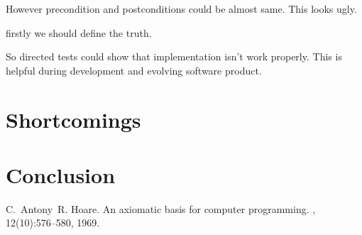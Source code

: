 \documentclass[twoside,twocolumn]{article}
\begin{document}



However precondition and postconditions could be almost same. This looks ugly.

firstly we should define the
truth. 

So directed tests could show that implementation isn't work properly. This is
helpful during development and evolving software product.





\section{Shortcomings}

\section{Conclusion}

\begin{thebibliography}{99} %

C.~Antony~R. Hoare.
\newblock An axiomatic basis for computer programming.
, 12(10):576--580, 1969.

\end{thebibliography}

\end{document}
